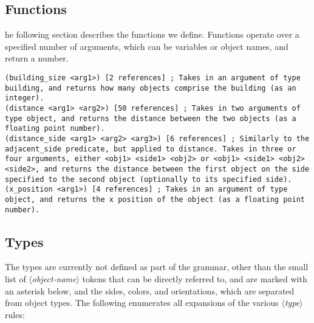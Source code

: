 \documentclass{article}
\newcommand{\dsl}[1]{{\it $\langle$#1$\rangle$}}
\begin{document}
\subsection{Functions} \label{sec:functions}
he following section describes the functions we define.
        Functions operate over a specified number of arguments, which can be variables or object names, and return a number.
\begin{lstlisting}
(building_size <arg1>) [2 references] ; Takes in an argument of type building, and returns how many objects comprise the building (as an integer).
(distance <arg1> <arg2>) [50 references] ; Takes in two arguments of type object, and returns the distance between the two objects (as a floating point number).
(distance_side <arg1> <arg2> <arg3>) [6 references] ; Similarly to the adjacent_side predicate, but applied to distance. Takes in three or four arguments, either <obj1> <side1> <obj2> or <obj1> <side1> <obj2> <side2>, and returns the distance between the first object on the side specified to the second object (optionally to its specified side).
(x_position <arg1>) [4 references] ; Takes in an argument of type object, and returns the x position of the object (as a floating point number).
\end{lstlisting}



\subsection{Types} \label{sec:types}
The types are currently not defined as part of the grammar, other than the small list of \dsl{object-name} tokens that can be directly referred to, and are marked with an asterisk below, and the sides, colors, and orientations, which are separated from object types.
        The following enumerates all expansions of the various \dsl{type} rules:
\end{document}
